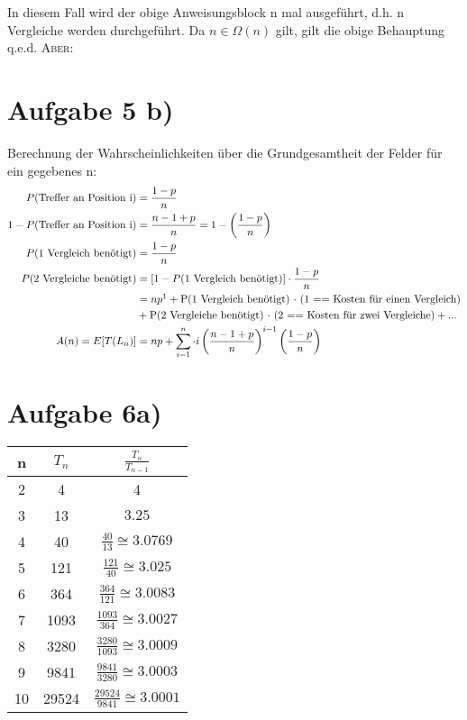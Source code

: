 \documentclass[a4paper,10pt,freqn]{article}
\begin{document}
In diesem Fall wird der obige Anweisungsblock n mal ausgeführt, d.h. n Vergleiche werden durchgeführt.
Da $n \in \Omega(n)$ gilt, gilt die obige Behauptung q.e.d.
{\LARGE \textsc{Aber:}}
\section{Aufgabe 5 b)}
Berechnung der Wahrscheinlichkeiten über die Grundgesamtheit der Felder für ein gegebenes n:
\begin{align*}
 P(\text{Treffer an Position i}) &= \frac{1-p}{n}\\
 1-P(\text{Treffer an Position i}) &= \frac{n-1+p}{n} = 1-\left(\frac{1-p}{n}\right)\\
 P(\text{1 Vergleich benötigt}) &=  \frac{1-p}{n}\\
 P(\text{2 Vergleiche benötigt}) &=  [1-P(\text{1 Vergleich benötigt})]\cdot\frac{1-p}{n}\\
 &= np\footnotemark + \text{P(1 Vergleich benötigt) $\cdot$ (1 == Kosten für einen Vergleich)}\\&+ \text{P(2 Vergleiche benötigt) $\cdot$ (2 == Kosten für zwei Vergleiche)} + ...\\
 A(n) = E[T(L_n)] &= np+\sum_{i=1}^{n}\cdot i\left(\frac{n-1+p}{n}\right)^{i-1}\left(\frac{1-p}{n}\right)
\end{align*}
\section{Aufgabe 6a)}
\renewcommand{\arraystretch}{1.3} 
\begin{tabular}{ccc}
 \toprule
 n&$T_n$&$\frac{T_n}{T_{n-1}}$\\
 \midrule
 2&4&4\\
 3&13&$3.25$\\
 4&40&$\frac{40}{13}\cong3.0769$\\
 5&121&$\frac{121}{40}\cong3.025$\\
 6&364&$\frac{364}{121}\cong3.0083$\\
 7&1093&$\frac{1093}{364}\cong3.0027$\\
 8&3280&$\frac{3280}{1093}\cong3.0009$\\
 9&9841&$\frac{9841}{3280}\cong3.0003$\\
 10&29524&$\frac{29524}{9841}\cong3.0001$\\
 \bottomrule
\end{tabular}
\end{document}
